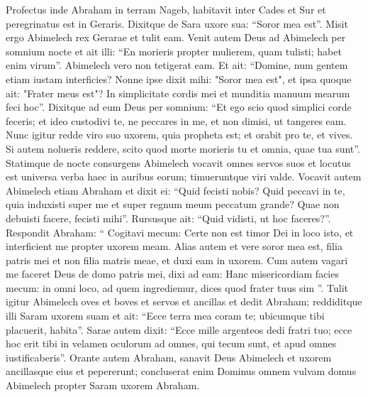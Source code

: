 \begin{biblechapter}
\begin{biblechapter}
\begin{biblechapter}
\begin{biblechapter}
\begin{biblechapter}
\begin{biblechapter}
\begin{biblechapter}
\begin{biblechapter}
\begin{biblechapter}
\begin{biblechapter}
\begin{biblechapter}
\begin{biblechapter}
\begin{biblechapter}
\begin{biblechapter}
\begin{biblechapter}
\begin{biblechapter}
\begin{biblechapter}
\begin{biblechapter}
\begin{biblechapter}
\begin{biblechapter}
\verse Profectus inde Abraham in terram Nageb, habitavit inter Cades et Sur et peregrinatus est in Geraris. 
\verse Dixitque de Sara uxore sua: “Soror mea est”. Misit ergo Abimelech rex Gerarae et tulit eam. 
\verse Venit autem Deus ad Abimelech per somnium nocte et ait illi: “En morieris propter mulierem, quam tulisti; habet enim virum”. 
\verse Abimelech vero non tetigerat eam. Et ait: “Domine, num gentem etiam iustam interficies? 
\verse Nonne ipse dixit mihi: "Soror mea est", et ipsa quoque ait: "Frater meus est"? In simplicitate cordis mei et munditia manuum mearum feci hoc”. 
\verse Dixitque ad eum Deus per somnium: “Et ego scio quod simplici corde feceris; et ideo custodivi te, ne peccares in me, et non dimisi, ut tangeres eam. 
\verse Nunc igitur redde viro suo uxorem, quia propheta est; et orabit pro te, et vives. Si autem nolueris reddere, scito quod morte morieris tu et omnia, quae tua sunt”.
 \verse Statimque de nocte consurgens Abimelech vocavit omnes servos suos et locutus est universa verba haec in auribus eorum; timueruntque viri valde. 
\verse Vocavit autem Abimelech etiam Abraham et dixit ei: “Quid fecisti nobis? Quid peccavi in te, quia induxisti super me et super regnum meum peccatum grande? Quae non debuisti facere, fecisti mihi”. 
\verse Rursusque ait: “Quid vidisti, ut hoc faceres?”. 
\verse Respondit Abraham: “ Cogitavi mecum: Certe non est timor Dei in loco isto, et interficient me propter uxorem meam. 
\verse Alias autem et vere soror mea est, filia patris mei et non filia matris meae, et duxi eam in uxorem. 
\verse Cum autem vagari me faceret Deus de domo patris mei, dixi ad eam: Hanc misericordiam facies mecum: in omni loco, ad quem ingrediemur, dices quod frater tuus sim ”.
 \verse Tulit igitur Abimelech oves et boves et servos et ancillas et dedit Abraham; reddiditque illi Saram uxorem suam 
\verse et ait: “Ecce terra mea coram te; ubicumque tibi placuerit, habita”. 
\verse Sarae autem dixit: “Ecce mille argenteos dedi fratri tuo; ecce hoc erit tibi in velamen oculorum ad omnes, qui tecum sunt, et apud omnes iustificaberis”. 
\verse Orante autem Abraham, sanavit Deus Abimelech et uxorem ancillasque eius et pepererunt; 
\verse concluserat enim Dominus omnem vulvam domus Abimelech propter Saram uxorem Abraham.
 

\end{biblechapter}
\end{biblechapter}
\end{biblechapter}
\end{biblechapter}
\end{biblechapter}
\end{biblechapter}
\end{biblechapter}
\end{biblechapter}
\end{biblechapter}
\end{biblechapter}
\end{biblechapter}
\end{biblechapter}
\end{biblechapter}
\end{biblechapter}
\end{biblechapter}
\end{biblechapter}
\end{biblechapter}
\end{biblechapter}
\end{biblechapter}
\end{biblechapter}
